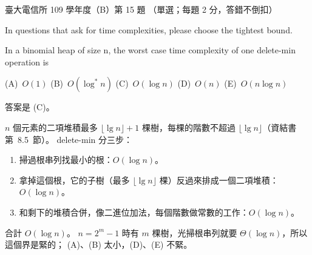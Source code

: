 \begin{pastexam}[label={px:ntu-109-comm-dsa-15}]{臺大電信所 109 學年度（B）第 15 題}
（單選；每題 2 分，答錯不倒扣）

In questions that ask for time complexities, please choose the tightest bound.

In a binomial heap of size n, the worst case time complexity of one delete-min operation is

(A)~$O(1)$ \qquad (B)~$O(\log^* n)$ \qquad (C)~$O(\log n)$ \qquad (D)~$O(n)$ \qquad (E)~$O(n\log n)$
\end{pastexam}

\begin{pastsoln}
答案是 (C)。

$n$ 個元素的二項堆積最多 $\lfloor \lg n \rfloor + 1$ 棵樹，每棵的階數不超過
$\lfloor \lg n \rfloor$（資結書第~8.5~節）。 delete-min 分三步：
\begin{enumerate}
\item 掃過根串列找最小的根：$O(\log n)$。
\item 拿掉這個根，它的子樹（最多 $\lfloor \lg n \rfloor$ 棵）反過來排成一個二項堆積：
$O(\log n)$。
\item 和剩下的堆積合併，像二進位加法，每個階數做常數的工作：$O(\log n)$。
\end{enumerate}
合計 $O(\log n)$。 $n = 2^m - 1$ 時有 $m$ 棵樹，光掃根串列就要 $\Theta(\log n)$，所以這個界是緊的；
(A)、(B) 太小，(D)、(E) 不緊。
\end{pastsoln}
